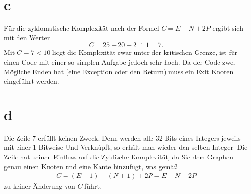 \section*{c}
Für die zyklomatische Komplexität nach der Formel $ C=E-N+2P$ ergibt sich mit den Werten
\begin{equation}
	C= 25-20+2 \doteq 1 = 7.
\end{equation}
Mit $C=7<10$ liegt die Komplexität zwar unter der kritischen Grenze, ist für einen Code mit einer so simplen Aufgabe jedoch sehr hoch. 
Da der Code zwei Mögliche Enden hat (eine Exception oder den Return) muss ein Exit Knoten eingeführt werden.



%

\section*{d}
Die Zeile 7 erfüllt keinen Zweck. Denn werden alle 32 Bits eines Integers jeweils mit einer 1 Bitweise Und-Verknüpft, so erhält man wieder den selben Integer.
Die Zeile hat keinen Einfluss auf die Zyklische Komplexität, da Sie dem Graphen genau einen Knoten und eine Kante hinzufügt, was gemäß
\begin{align}
	C = (E + 1) - (N + 1) + 2P = E - N + 2P
\end{align}
zu keiner Änderung von $C$ führt.
